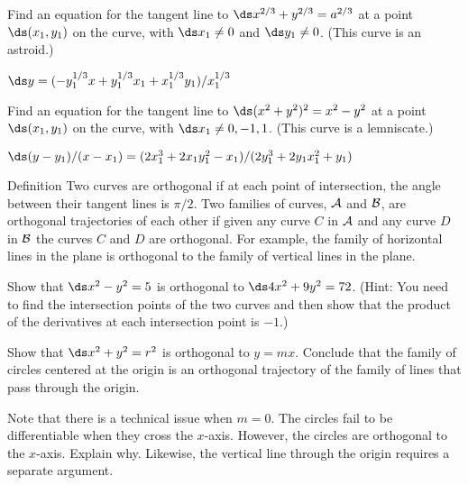 \begin{exercises}
\begin{exercise} Find an equation for the tangent line to $\ds x^{2/3} +
y^{2/3} = a^{2/3}$ at a point $\ds (x_1 ,y_1)$ on the curve, 
with $\ds x_1 \neq 0$ and $\ds y_1 \neq 0$. (This curve is an {\dfont astroid}.)
\begin{answer} $\ds y=(-y_1^{1/3}x+y_1^{1/3}x_1+x_1^{1/3}y_1)/x_1^{1/3}$
\end{answer}\end{exercise}

\begin{exercise} Find an equation for the tangent line to $\ds (x^2 +y^2 )^2 =x^2
-y^2$ at a point $\ds (x_1 , y_1)$ on the curve, with $\ds x_1 \neq 0, -1, 1$.
(This curve is a {\dfont lemniscate}.)
\begin{answer} $\ds (y-y_1)/(x-x_1)=(2x_1^3+2x_1y_1^2-x_1)/(2y_1^3+2y_1x_1^2+y_1)$
\end{answer}\end{exercise}

\begin{remark}{Definition}
Two curves are {\dfont orthogonal\/} if at each point of intersection,
the angle between their tangent lines is $\pi/2$. Two
families of curves, $\cal{A}$ and $\cal{B}$, are
{\dfont orthogonal trajectories} of each other if given any curve $C$
in $\cal{A}$ and any curve $D$ in $\cal{B}$ the curves $C$
and $D$ are orthogonal.
For example, the family of horizontal lines in the plane is
orthogonal to the family of vertical lines in the plane.
\end{remark}

 \begin{exercise} Show that $\ds x^2 -y^2 =5$ is orthogonal to $\ds 4x^2 +9y^2
 =72$. (Hint: You need to find the intersection points of the two
 curves and then show that the product of the derivatives at each
 intersection point is $-1$.)
\end{exercise}

\begin{exercise} Show that $\ds x^2 +y^2 = r^2$ is orthogonal to
$y=mx$. Conclude that the family of circles centered at the origin is
an orthogonal trajectory of the family of lines that pass through the
origin.

Note that there is a technical issue when $m=0$. The circles fail to
be differentiable when they cross the $x$-axis. However, the circles
are orthogonal to the $x$-axis. Explain why. Likewise, the vertical
line through the origin requires a separate argument.
\end{exercise}


\end{exercises}

